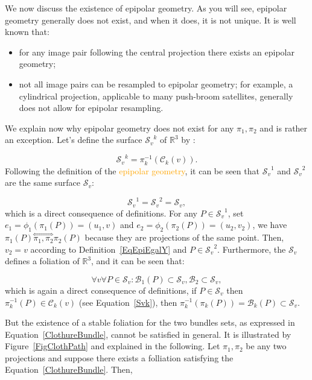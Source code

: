 \documentclass{ipol}
\newcommand{\RR}{\ensuremath{\mathbb{R}}}
\newcommand{\HComp}{\overset{\Longleftrightarrow}{\scriptscriptstyle \pi_1,\pi_2}}
\newcommand{\Bund}[1]{\ensuremath{\mathcal{B}_{#1}}}
\newcommand{\BundO}{\Bund{1}}
\newcommand{\BundT}{\Bund{2}}
\newcommand{\BundK}{\Bund{k}}
\newcommand{\CurveE}[1]{\ensuremath{\mathcal{C}_{#1}}}
\newcommand{\CurveK}{\CurveE{k}}
\newcommand{\Sv}{\ensuremath{\mathcal{S}_{v}}}
\newcommand{\er}[1]{\textcolor{orange}{#1}}
\begin{document}
We now discuss the existence of {epipolar geometry}. As you will see, epipolar geometry generally does not exist, and when it does, it is not
unique. It is well known that:

\begin{itemize}
    \item for any image pair following the central projection there exists  an epipolar geometry;

    \item  not all image pairs can be resampled to epipolar geometry; for example, a cylindrical projection, applicable to many push-broom satellites, generally does not allow for epipolar resampling.

\end{itemize}
We explain now why epipolar geometry does not exist for any $\pi_1,\pi_2$ and is rather an exception. Let's define the surface $\Sv^k$ of $\RR^3$ by :

\begin{equation}
   \Sv^k = \pi_k^{-1}(\CurveK(v)).  \label{Svk}
\end{equation}
Following the definition of the \er{epipolar geometry}, it can be seen that $\Sv^1$ and $\Sv^2$ are the same surface $\Sv$:

\begin{equation}
   \Sv^1 = \Sv^2 = \Sv,
\end{equation}
which is a direct consequence of definitions. For any $P\in\Sv^1$, set  $e_1=\phi_1(\pi_1(P))=(u_1,v)$
and $e_2=\phi_2(\pi_2(P))=(u_2,v_2)$, we have $\pi_1(P) \HComp \pi_2(P)$ because they are projections
of the same point. Then, $v_2=v$ according to Definition~\ref{EqEpiEgalY} and $P \in \Sv^2$. Furthermore, the $\Sv$ defines a foliation of $\RR^3$, and it can be seen that:

\begin{equation}
   \forall v \forall P \in \Sv :  \BundO(P) \subset \Sv , \BundT \subset \Sv, \label{ClothureBundle}
\end{equation}
which is again a direct consequence of definitions, if $P \in \Sv$ then $\pi_k^{-1}(P) \in \CurveK(v)$
(see Equation~\ref{Svk}), then $\pi_k^{-1}(\pi_k(P)) = \BundK(P) \subset \Sv$.


But the existence of a stable foliation for the two bundles sets, as expressed in Equation~\ref{ClothureBundle},
cannot  be satisfied in general. It is  illustrated 
by Figure~\ref{FigClothPath} and explained in the following.  Let $\pi_1,\pi_2$ be any two  projections and suppose
there exists  a folliation satisfying the Equation~\ref{ClothureBundle}. Then, 
\end{document}
